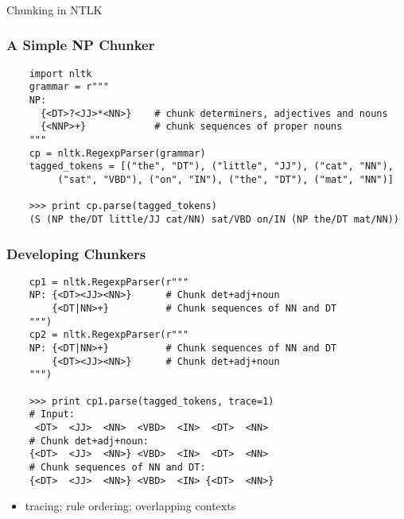 \begin{frame}[fragile]\frametitle{}

\begin{center}
{\Large Chunking in NTLK}
\end{center}
\end{frame}

\begin{frame}[fragile]\frametitle{A Simple NP Chunker}
  \scriptsize

\begin{lstlisting}
    import nltk
    grammar = r"""
    NP:
      {<DT>?<JJ>*<NN>}    # chunk determiners, adjectives and nouns
      {<NNP>+}            # chunk sequences of proper nouns
    """
    cp = nltk.RegexpParser(grammar)
    tagged_tokens = [("the", "DT"), ("little", "JJ"), ("cat", "NN"),
         ("sat", "VBD"), ("on", "IN"), ("the", "DT"), ("mat", "NN")]

    >>> print cp.parse(tagged_tokens)
    (S (NP the/DT little/JJ cat/NN) sat/VBD on/IN (NP the/DT mat/NN))
\end{lstlisting}
\end{frame}

\begin{frame}[fragile]\frametitle{Developing Chunkers}
  \tiny

\begin{lstlisting}
    cp1 = nltk.RegexpParser(r"""
    NP: {<DT><JJ><NN>}      # Chunk det+adj+noun
        {<DT|NN>+}          # Chunk sequences of NN and DT
    """)
    cp2 = nltk.RegexpParser(r"""
    NP: {<DT|NN>+}          # Chunk sequences of NN and DT
        {<DT><JJ><NN>}      # Chunk det+adj+noun
    """)
    
    >>> print cp1.parse(tagged_tokens, trace=1)
    # Input:
     <DT>  <JJ>  <NN>  <VBD>  <IN>  <DT>  <NN> 
    # Chunk det+adj+noun:
    {<DT>  <JJ>  <NN>} <VBD>  <IN>  <DT>  <NN> 
    # Chunk sequences of NN and DT:
    {<DT>  <JJ>  <NN>} <VBD>  <IN> {<DT>  <NN>}
\end{lstlisting}

\begin{itemize}
  \item tracing; rule ordering; overlapping contexts
\end{itemize}
\end{frame}

